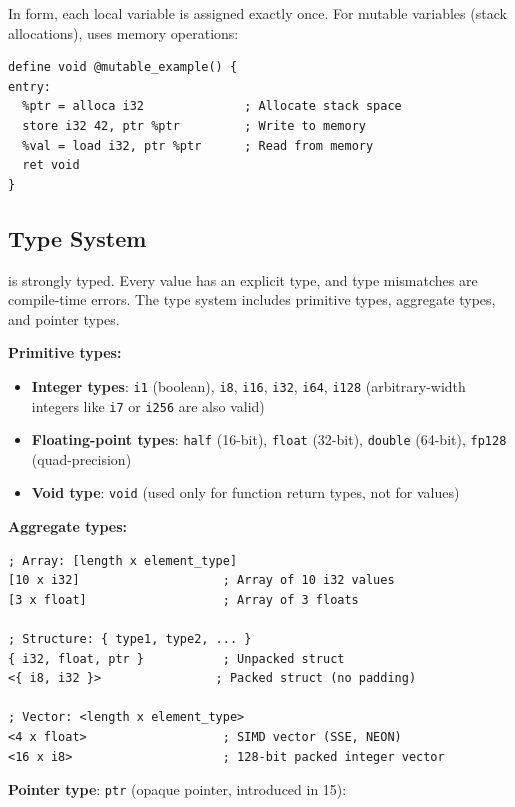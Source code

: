 In  form, each local variable is assigned exactly once. For mutable variables (stack allocations),  uses memory operations:

\begin{lstlisting}[style=ir]
define void @mutable_example() {
entry:
  %ptr = alloca i32              ; Allocate stack space
  store i32 42, ptr %ptr         ; Write to memory
  %val = load i32, ptr %ptr      ; Read from memory
  ret void
}
\end{lstlisting}

\subsection{Type System}

  is strongly typed. Every value has an explicit type, and type mismatches are compile-time errors. The type system includes primitive types, aggregate types, and pointer types.

\textbf{Primitive types:}

\begin{itemize}[noitemsep]
  \item \textbf{Integer types}: \texttt{i1} (boolean), \texttt{i8}, \texttt{i16}, \texttt{i32}, \texttt{i64}, \texttt{i128} (arbitrary-width integers like \texttt{i7} or \texttt{i256} are also valid)
  \item \textbf{Floating-point types}: \texttt{half} (16-bit), \texttt{float} (32-bit), \texttt{double} (64-bit), \texttt{fp128} (quad-precision)
  \item \textbf{Void type}: \texttt{void} (used only for function return types, not for values)
\end{itemize}

\textbf{Aggregate types:}

\begin{lstlisting}[style=ir]
; Array: [length x element_type]
[10 x i32]                    ; Array of 10 i32 values
[3 x float]                   ; Array of 3 floats

; Structure: { type1, type2, ... }
{ i32, float, ptr }           ; Unpacked struct
<{ i8, i32 }>                ; Packed struct (no padding)

; Vector: <length x element_type>
<4 x float>                   ; SIMD vector (SSE, NEON)
<16 x i8>                     ; 128-bit packed integer vector
\end{lstlisting}

\textbf{Pointer type}: \texttt{ptr} (opaque pointer, introduced in  15):

